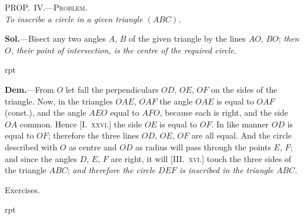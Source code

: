 \documentclass[oneside]{book}
\newcommand\myprop[2]{
\bigskip\Needspace*{4\baselineskip}\begin{center}\textsc{#1}\\\medskip\emph{#2}\par\end{center}
}
\newcommand\exheadin[1]{
\par\medskip\Needspace*{4\baselineskip}
\hspace{1.5\parindent}\textsf{#1}\par\medskip
}
\newcommand\imgflow[3]{
\setcounter{wrapwidth}{#1}
\begin{wrapfigure}[#2]{r}{\value{wrapwidth}pt}
\begin{center}
\vspace{-0.3in}
\end{center}
\end{wrapfigure}
}
\begin{document}
\myprop{PROP\@.~IV\@.---Problem.}{To inscribe a circle in a given triangle $(ABC)$.}

\textbf{Sol.}---Bisect any two angles $A$, $B$ of the given triangle
by the lines $AO$, $BO$; \emph{then $O$, their point of
intersection, is the centre of the required circle.}

\imgflow{120}{11}{f154}

\textbf{Dem.}---From $O$ let fall the perpendiculars $OD$, $OE$,
$OF$ on the sides of the triangle. Now, in the triangles $OAE$,
$OAF$ the angle $OAE$ is equal to
$OAF$ (const.), and the angle
$AEO$ equal to $AFO$, because
each is right, and the side $OA$
common. Hence [I.~\textsc{xxvi.}] the
side $OE$ is equal to $OF$. In
like manner $OD$ is equal to $OF$;
therefore the three lines $OD$,
$OE$, $OF$ are all equal. And the
circle described with $O$ as centre and $OD$ as radius will
pass through the points $E$, $F$; and since the angles
$D$, $E$, $F$ are right, it will [III\@.~\textsc{xvi.}] touch the three
sides of the triangle $ABC$; \textit{and therefore the circle $DEF$
is inscribed in the triangle $ABC$.}

\exheadin{Exercises.}

\imgflow{155}{19}{f155}
\end{document}
